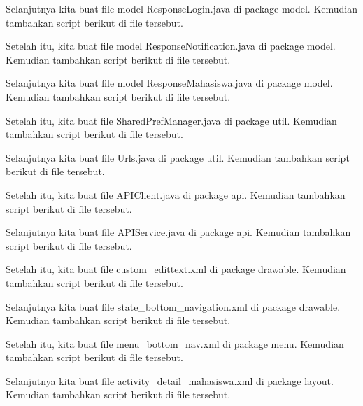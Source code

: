 Selanjutnya kita buat file model ResponseLogin.java di package model. Kemudian tambahkan script berikut di file tersebut.


Setelah itu, kita buat file model ResponseNotification.java di package model. Kemudian tambahkan script berikut di file tersebut.


Selanjutnya kita buat file model ResponseMahasiswa.java di package model. Kemudian tambahkan script berikut di file tersebut.


Setelah itu, kita buat file SharedPrefManager.java di package util. Kemudian tambahkan script berikut di file tersebut.


Selanjutnya kita buat file Urls.java di package util. Kemudian tambahkan script berikut di file tersebut.


Setelah itu, kita buat file APIClient.java di package api. Kemudian tambahkan script berikut di file tersebut.


Selanjutnya kita buat file APIService.java di package api. Kemudian tambahkan script berikut di file tersebut.


Setelah itu, kita buat file custom\_edittext.xml di package drawable. Kemudian tambahkan script berikut di file tersebut.


Selanjutnya kita buat file state\_bottom\_navigation.xml di package drawable. Kemudian tambahkan script berikut di file tersebut.


Setelah itu, kita buat file menu\_bottom\_nav.xml di package menu. Kemudian tambahkan script berikut di file tersebut.


Selanjutnya kita buat file activity\_detail\_mahasiswa.xml di package layout. Kemudian tambahkan script berikut di file tersebut.


